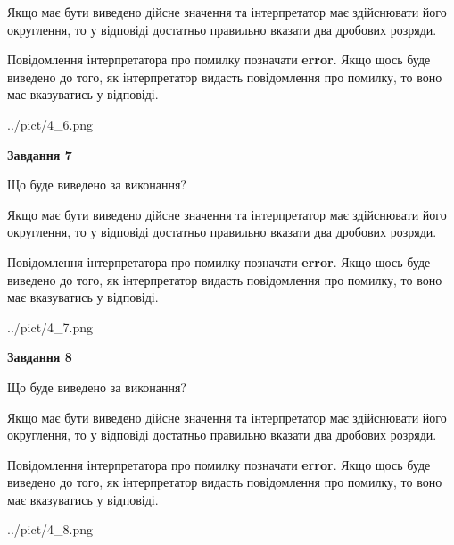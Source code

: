 \documentclass[12pt, ukrainian]{article}
\begin{document}
{\begin {Large}
Якщо має бути виведено дійсне значення та інтерпретатор має здійснювати його округлення, 
то у відповіді достатньо правильно вказати два дробових розряди.

Повідомлення інтерпретатора про помилку позначати \textbf{error}.
Якщо щось буде виведено до того, як інтерпретатор видасть повідомлення про помилку, 
то воно має вказуватись у відповіді. \par

\begin{center}
	{../pict/4_6.png}
\end{center}
\newpage

{\begin {center}\textbf{Завдання 7}\end {center}}\par
Що буде виведено за виконання? \par

Якщо має бути виведено дійсне значення та інтерпретатор має здійснювати його округлення, 
то у відповіді достатньо правильно вказати два дробових розряди.

Повідомлення інтерпретатора про помилку позначати \textbf{error}.
Якщо щось буде виведено до того, як інтерпретатор видасть повідомлення про помилку, 
то воно має вказуватись у відповіді. \par

\begin{center}
	{../pict/4_7.png}
\end{center}
\newpage

{\begin {center}\textbf{Завдання 8}\end {center}}\par
Що буде виведено за виконання? \par

Якщо має бути виведено дійсне значення та інтерпретатор має здійснювати його округлення, 
то у відповіді достатньо правильно вказати два дробових розряди.

Повідомлення інтерпретатора про помилку позначати \textbf{error}.
Якщо щось буде виведено до того, як інтерпретатор видасть повідомлення про помилку, 
то воно має вказуватись у відповіді. \par

\begin{center}
	{../pict/4_8.png}
\end{center}
\newpage


\end{Large}}
\end{document}
